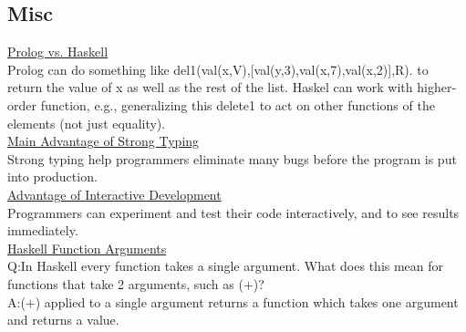 \documentclass[10pt,landscape,a4paper]{article}
\begin{document}
\begin{multicols*}{5}
\section{Misc}
\underline{Prolog vs. Haskell} \\
Prolog can do something like del1(val(x,V),[val(y,3),val(x,7),val(x,2)],R). to return the value of x as well as the rest of the list. Haskel can work with higher-order function, e.g., generalizing this delete1 to act on other functions of the elements (not just equality). \\
\underline{Main Advantage of Strong Typing} \\
Strong typing help programmers eliminate many bugs before the program is put into production. \\
\underline{Advantage of Interactive Development} \\
Programmers can experiment and test their code interactively, and to see results immediately. \\
\underline{Haskell Function Arguments} \\
Q:\@ In Haskell every function takes a single argument. What does this mean for functions that take 2 arguments, such as (\(+\))? \\
A:\@ (\(+\)) applied to a single argument returns a function which takes one argument and returns a value.

\end{multicols*}
\end{document}
